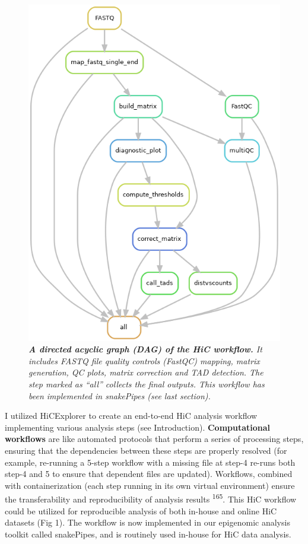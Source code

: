 \documentclass[11pt,twoside]{MPIthesis}
\theoremstyle{definition}
\theoremstyle{definition}
\theoremstyle{definition}
\theoremstyle{remark}
\begin{document}
\clearpage
\begin{figure}

{\centering \includegraphics[width=0.5\linewidth]{figures/results_fig1} 

}

\caption[A directed acyclic graph (DAG) of the HiC workflow]{\emph{\textbf{A directed acyclic graph (DAG) of the HiC
workflow.} It includes FASTQ file quality controls (FastQC) mapping,
matrix generation, QC plots, matrix correction and TAD detection. The
step marked as ``all'' collects the final outputs. This workflow has
been implemented in snakePipes (see last section).}}\label{fig:unnamed-chunk-6}
\end{figure}






I utilized HiCExplorer to create an end-to-end HiC analysis workflow
implementing various analysis steps (see Introduction).
\textbf{Computational workflows} are like automated protocols that
perform a series of processing steps, ensuring that the dependencies
between these steps are properly resolved (for example, re-running a
5-step workflow with a missing file at step-4 re-runs both step-4 and 5
to ensure that dependent files are updated). Workflows, combined with
containerization (each step running in its own virtual environment)
ensure the transferability and reproducibility of analysis results
\textsuperscript{165}. This HiC workflow could be utilized for
reproducible analysis of both in-house and online HiC datasets (Fig 1).
The workflow is now implemented in our epigenomic analysis toolkit
called snakePipes, and is routinely used in-house for HiC data analysis.
\end{document}
